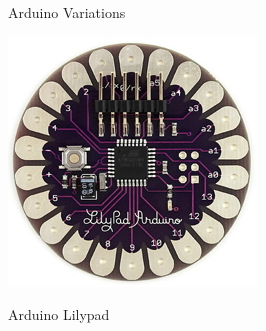 \documentclass{beamer}
\begin{document}
\begin{frame}{Arduino Variations}
  \centerline{\includegraphics[width=.5\textwidth]{LilyPad_3.jpg}}
  \centerline{Arduino Lilypad}
\end{frame}
\end{document}
